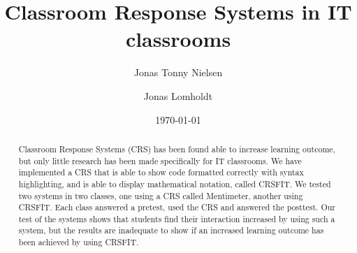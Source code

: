\documentclass{article}
\title{Classroom Response Systems in IT classrooms}
\author{Jonas Tonny Nielsen \and Jonas Lomholdt}
\date{\today}
\begin{document}
\maketitle

\begin{abstract}
Classroom Response Systems (CRS) has been found able to increase learning outcome, but only little research has been made specifically for IT classrooms. We have implemented a CRS that is able to show code formatted correctly with syntax highlighting, and is able to display mathematical notation, called CRSFIT. We tested two systems in two classes, one using a CRS called Mentimeter, another using CRSFIT. Each class answered a pretest, used the CRS and answered the posttest. Our test of the systems shows that students find their interaction increased by using such a system, but the results are inadequate to show if an increased learning outcome has been achieved by using CRSFIT.
\end{abstract}

\tableofcontents

\clearpage
\listoffigures

\listoftables

\lstlistoflistings


\clearpage
 \clearpage

 \clearpage
 \clearpage
 \clearpage
 \clearpage
 \clearpage
 \clearpage



\clearpage

\end{document}
